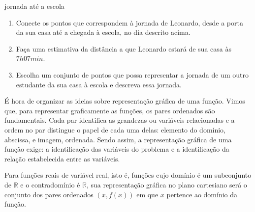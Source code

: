 \begin{task}{ jornada até a escola}
\begin{enumerate}
\item {} 
Conecte os pontos que correspondem à jornada de Leonardo, desde a porta da sua casa até a chegada à escola, no dia descrito acima.

\item {} 
Faça uma estimativa da distância a que Leonardo estará de sua casa às \(7h07min\).

\item {} 
Escolha um conjunto de pontos que possa representar a jornada de um outro estudante da sua casa à escola e descreva essa jornada.

\end{enumerate}
\end{task}

\label{\detokenize{AF106-5:sec-organizando-graficos}}\label{\detokenize{AF106-5:organizando-as-ideias-graficos}}\label{\detokenize{AF106-5::doc}}
É hora de organizar as ideias sobre representação gráfica de uma função. Vimos que, para representar graficamente as funções, os pares ordenados são fundamentais. Cada par identifica as grandezas ou variáveis relacionadas e a ordem no par distingue o papel de cada uma delas: elemento do domínio, abscissa, e imagem, ordenada. Sendo assim, a representação gráfica de uma função exige: a identificação das variáveis do problema e a identificação da relação estabelecida entre as variáveis.

Para funções reais de variável real, isto é, funções cujo domínio é um subconjunto de \(\mathbb{R}\) e o contradomínio é \(\mathbb{R}\), sua representação gráfica no plano cartesiano será o conjunto dos pares ordenados \((x,f(x))\) em que \(x\) pertence ao domínio da função.

\begin{figure}[H]
\centering

\end{figure}

